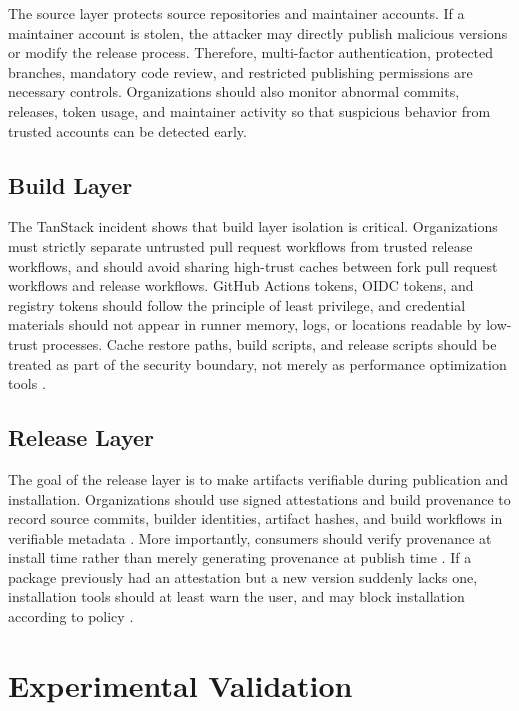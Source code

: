\documentclass[12pt,a4paper]{article}
\begin{document}
The source layer protects source repositories and maintainer accounts. If a maintainer account is stolen, the attacker may directly publish malicious versions or modify the release process. Therefore, multi-factor authentication, protected branches, mandatory code review, and restricted publishing permissions are necessary controls. Organizations should also monitor abnormal commits, releases, token usage, and maintainer activity so that suspicious behavior from trusted accounts can be detected early.

\subsection{Build Layer}

The TanStack incident shows that build layer isolation is critical. Organizations must strictly separate untrusted pull request workflows from trusted release workflows, and should avoid sharing high-trust caches between fork pull request workflows and release workflows. GitHub Actions tokens, OIDC tokens, and registry tokens should follow the principle of least privilege, and credential materials should not appear in runner memory, logs, or locations readable by low-trust processes. Cache restore paths, build scripts, and release scripts should be treated as part of the security boundary, not merely as performance optimization tools \cite{tanstack-postmortem,tanstack-followup}.

\subsection{Release Layer}

The goal of the release layer is to make artifacts verifiable during publication and installation. Organizations should use signed attestations and build provenance to record source commits, builder identities, artifact hashes, and build workflows in verifiable metadata \cite{slsa-about}. More importantly, consumers should verify provenance at install time rather than merely generating provenance at publish time \cite{slsa-verify}. If a package previously had an attestation but a new version suddenly lacks one, installation tools should at least warn the user, and may block installation according to policy \cite{npq}.

\section{Experimental Validation}
\end{document}
